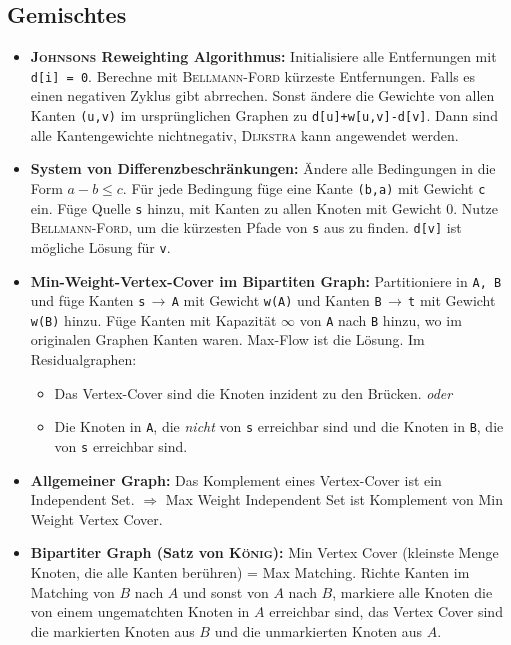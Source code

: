 \subsection{Gemischtes}
\begin{itemize}
	\item \textbf{\textsc{Johnsons} Reweighting Algorithmus:}
	Initialisiere alle Entfernungen mit \texttt{d[i] = 0}. Berechne mit \textsc{Bellmann-Ford} kürzeste Entfernungen.
	Falls es einen negativen Zyklus gibt abrrechen.
	Sonst ändere die Gewichte von allen Kanten \texttt{(u,v)} im ursprünglichen Graphen zu \texttt{d[u]+w[u,v]-d[v]}.
	Dann sind alle Kantengewichte nichtnegativ, \textsc{Dijkstra} kann angewendet werden.

	\item \textbf{System von Differenzbeschränkungen:}
	Ändere alle Bedingungen in die Form $a-b \leq c$.
	Für jede Bedingung füge eine Kante \texttt{(b,a)} mit Gewicht \texttt{c} ein.
	Füge Quelle \texttt{s} hinzu, mit Kanten zu allen Knoten mit Gewicht 0.
	Nutze \textsc{Bellmann-Ford}, um die kürzesten Pfade von \texttt{s} aus zu finden.
	\texttt{d[v]} ist mögliche Lösung für \texttt{v}.

	\item \textbf{Min-Weight-Vertex-Cover im Bipartiten Graph:}
	Partitioniere in \texttt{A, B} und füge Kanten \texttt{s}\,$\rightarrow$\,\texttt{A} mit Gewicht \texttt{w(A)} und Kanten  \texttt{B}\,$\rightarrow$\,\texttt{t} mit Gewicht \texttt{w(B)} hinzu.
	Füge Kanten mit Kapazität $\infty$ von \texttt{A} nach \texttt{B} hinzu, wo im originalen Graphen Kanten waren.
	Max-Flow ist die Lösung.\newline
	Im Residualgraphen:
	\begin{itemize}
		\item Das Vertex-Cover sind die Knoten inzident zu den Brücken. \emph{oder}
		\item Die Knoten in \texttt{A}, die \emph{nicht} von \texttt{s} erreichbar sind und die Knoten in \texttt{B}, die von \texttt{s} erreichbar sind.
	\end{itemize}

	\item \textbf{Allgemeiner Graph:}
	Das Komplement eines Vertex-Cover ist ein Independent Set.
	$\Rightarrow$ Max Weight Independent Set ist Komplement von Min Weight Vertex Cover.

	\item \textbf{Bipartiter Graph (Satz von \textsc{König}):}
	Min Vertex Cover (kleinste Menge Knoten, die alle Kanten berühren) = Max Matching.
	Richte Kanten im Matching von $B$ nach $A$ und sonst von $A$ nach $B$, markiere alle Knoten die von einem ungematchten Knoten in $A$ erreichbar sind, das Vertex Cover sind die markierten Knoten aus $B$ und die unmarkierten Knoten aus $A$.


\end{itemize}

